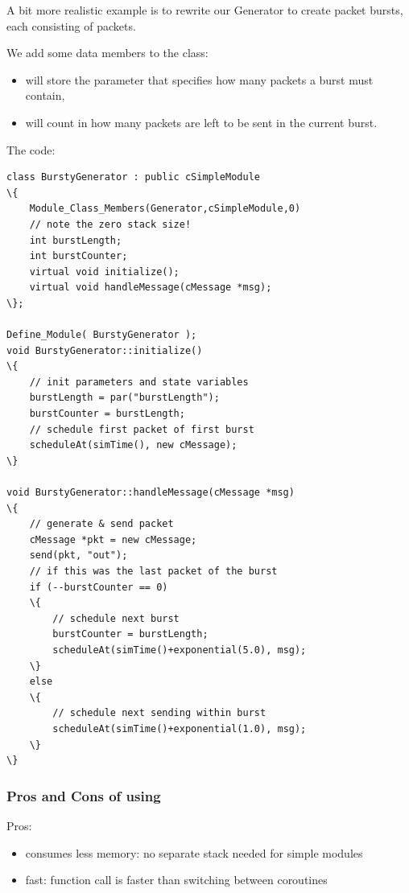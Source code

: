 A bit more realistic example is to rewrite our Generator to create
packet bursts, each consisting of  packets.

We add some data members to the class:
\begin{itemize}
\item{ will store the parameter that specifies how many
    packets a burst must contain,}
\item{ will count in how many packets are left to be sent
    in the current burst.}
\end{itemize}

The code:

\begin{Verbatim}[commandchars=\\\{\}]
class BurstyGenerator : public cSimpleModule
\{
    Module_Class_Members(Generator,cSimpleModule,0)
    // note the zero stack size!
    int burstLength;
    int burstCounter;
    virtual void initialize();
    virtual void handleMessage(cMessage *msg);
\};

Define_Module( BurstyGenerator );
void BurstyGenerator::initialize()
\{
    // init parameters and state variables
    burstLength = par("burstLength");
    burstCounter = burstLength;
    // schedule first packet of first burst
    scheduleAt(simTime(), new cMessage);
\}

void BurstyGenerator::handleMessage(cMessage *msg)
\{
    // generate & send packet
    cMessage *pkt = new cMessage;
    send(pkt, "out");
    // if this was the last packet of the burst
    if (--burstCounter == 0)
    \{
        // schedule next burst
        burstCounter = burstLength;
        scheduleAt(simTime()+exponential(5.0), msg);
    \}
    else
    \{
        // schedule next sending within burst
        scheduleAt(simTime()+exponential(1.0), msg);
    \}
\}
\end{Verbatim}



\subsubsection{Pros and Cons of using }


Pros:
\begin{itemize}
  \item{consumes less memory: no separate stack needed for simple modules}
  \item{fast: function call is faster than switching between coroutines}
\end{itemize}

